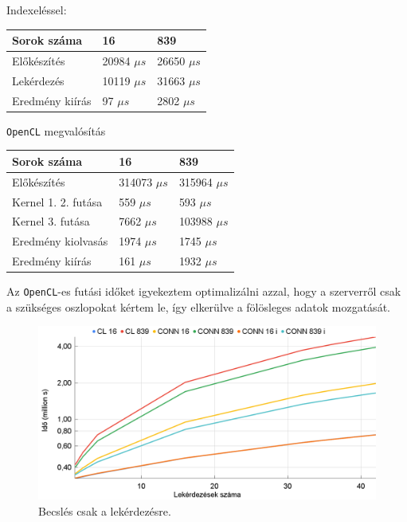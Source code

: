\newpage

Indexeléssel:

\begin{table}[h!]
\centering
\begin{tabular}{|p{6cm}|p{3cm}|p{3cm}|}
\hline
Sorok száma & 16 & 839 \\
\hline
\hline

Előkészítés & 20984 $\mu s$ & 26650 $\mu s$ \\
\hline

Lekérdezés & 10119 $\mu s$ & 31663 $\mu s$ \\
\hline

Eredmény kiírás & 97 $\mu s$ & 2802 $\mu s$ \\
\hline

\end{tabular}
\end{table}

\texttt{OpenCL} megvalósítás

\begin{table}[h!]
\centering
\begin{tabular}{|p{6cm}|p{3cm}|p{3cm}|}
\hline
Sorok száma & 16 & 839 \\
\hline
\hline
Előkészítés & 314073 $\mu s$ & 315964 $\mu s$ \\
\hline
Kernel 1. 2. futása & 559 $\mu s$ & 593 $\mu s$ \\
\hline
Kernel 3. futása & 7662 $\mu s$ & 103988 $\mu s$ \\
\hline
Eredmény kiolvasás & 1974 $\mu s$ & 1745 $\mu s$ \\
\hline
Eredmény kiírás & 161 $\mu s$ & 1932 $\mu s$ \\
\hline
\end{tabular}
\end{table}	

Az \texttt{OpenCL}-es futási időket igyekeztem optimalizálni azzal, hogy a szerverről csak a szükséges oszlopokat kértem le, így elkerülve a fölösleges adatok mozgatását.

\begin{figure}[h!]
\centering
\includegraphics[width=\textwidth]{images/test/join2.png}
\caption{Becslés csak a lekérdezésre.}
\label{fig:join}
\end{figure}

